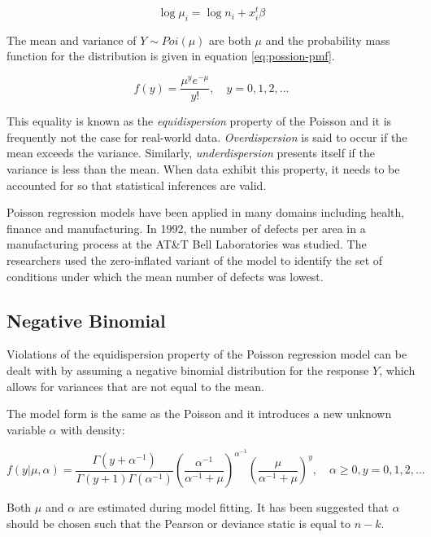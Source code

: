 \documentclass{thesis}
\begin{document}
\begin{equation}
    \log{\mu_i} = \log{n_i} + x_i^t\beta
\end{equation}

The mean and variance of $Y \sim Poi(\mu)$ are both $\mu$ and the probability mass function for the distribution is given in equation \ref{eq:possion-pmf}. 

\begin{equation}
f(y) = \frac{\mu^ye^{-\mu}}{y!},\hspace{1em}y = 0, 1, 2,...
\label{eq:possion-pmf}
\end{equation}

This equality is known as the \textit{equidispersion} property of the Poisson and it is frequently not the case for real-world data. \textit{Overdispersion} is said to occur if the mean exceeds the variance. Similarly, \textit{underdispersion} presents itself if the variance is less than the mean. When data exhibit this property, it needs to be accounted for so that statistical inferences are valid\cite{understanding-poisson}.

Poisson regression models have been applied in many domains including health, finance and manufacturing. In 1992, the number of defects per area in a manufacturing process at the AT\&T Bell Laboratories was studied\cite{defects}. The researchers used the zero-inflated variant of the model to identify the set of conditions under which the mean number of defects was lowest.

\subsection{Negative Binomial}

Violations of the equidispersion property of the Poisson regression model can be dealt with by assuming a negative binomial distribution for the response $Y$, which allows for variances that are not equal to the mean.

The model form is the same as the Poisson and it introduces a new unknown variable $\alpha$ with density:

\begin{equation}
    f(y|\mu,\alpha) = \frac{\Gamma(y + \alpha^{-1})}{\Gamma(y+1)\Gamma(\alpha^{-1})}(\frac{\alpha^{-1}}{\alpha^{-1} + \mu})^{\alpha^{-1}}(\frac{\mu}{\alpha^{-1} + \mu})^y,\hspace{1em}\alpha\ge 0, y=0,1,2,...
\end{equation}

Both $\mu$ and $\alpha$ are estimated during model fitting. It has been suggested that $\alpha$ should be chosen such that the Pearson or deviance static is equal to $n - k$\cite{cameron_trivedi_2013}.
\end{document}
